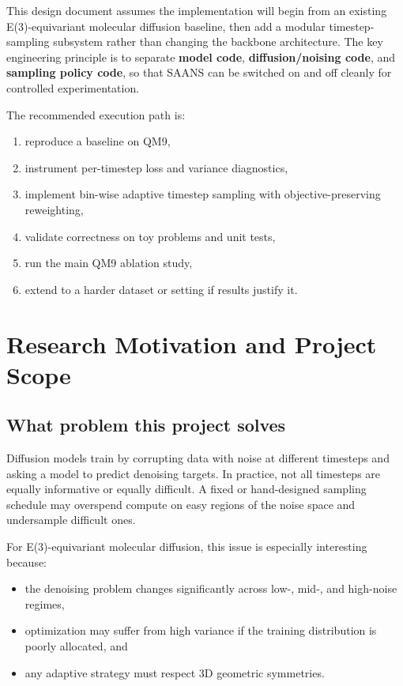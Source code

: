 \documentclass[11pt]{report}
\begin{document}
This design document assumes the implementation will begin from an existing E(3)-equivariant molecular diffusion baseline, then add a modular timestep-sampling subsystem rather than changing the backbone architecture. The key engineering principle is to separate \textbf{model code}, \textbf{diffusion/noising code}, and \textbf{sampling policy code}, so that SAANS can be switched on and off cleanly for controlled experimentation.

The recommended execution path is:

\begin{enumerate}[leftmargin=2em]
    \item reproduce a baseline on QM9,
    \item instrument per-timestep loss and variance diagnostics,
    \item implement bin-wise adaptive timestep sampling with objective-preserving reweighting,
    \item validate correctness on toy problems and unit tests,
    \item run the main QM9 ablation study,
    \item extend to a harder dataset or setting if results justify it.
\end{enumerate}

\chapter{Research Motivation and Project Scope}

\section{What problem this project solves}

Diffusion models train by corrupting data with noise at different timesteps and asking a model to predict denoising targets. In practice, not all timesteps are equally informative or equally difficult. A fixed or hand-designed sampling schedule may overspend compute on easy regions of the noise space and undersample difficult ones.

For E(3)-equivariant molecular diffusion, this issue is especially interesting because:

\begin{itemize}[leftmargin=2em]
    \item the denoising problem changes significantly across low-, mid-, and high-noise regimes,
    \item optimization may suffer from high variance if the training distribution is poorly allocated, and
    \item any adaptive strategy must respect 3D geometric symmetries.
\end{itemize}
\end{document}

